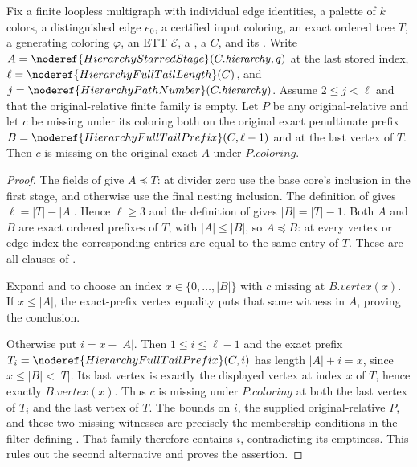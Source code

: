 \begin{helper}
Fix a finite loopless multigraph with individual edge identities,
a palette of $k$ colors, a distinguished edge $e_0$, a certified input
coloring, an exact ordered tree $T$, a generating coloring $\varphi$,
an ETT $\mathcal E$, a , a
 $C$, and its
.
Write $A=\noderef{HierarchyStarredStage}(C.\mathit{hierarchy},q)$ at
the last stored index, $\ell=\noderef{HierarchyFullTailLength}(C)$,
and $j=\noderef{HierarchyPathNumber}(C.\mathit{hierarchy})$.
Assume $2\le j<\ell$ and that the original-relative finite family
 is empty.
Let $P$ be any original-relative
 and let $c$ be missing
under its coloring both on the original exact penultimate prefix
$B=\noderef{HierarchyFullTailPrefix}(C,\ell-1)$ and at the last
vertex of $T$. Then $c$ is missing on the original exact $A$ under
$P.\mathit{coloring}$.
\end{helper}
\begin{proof}
The fields of  give
$A\preccurlyeq T$: at divider zero use the base core's inclusion
in the first stage, and otherwise use the final nesting inclusion.
The definition of  gives
$\ell=|T|-|A|$. Hence $\ell\ge3$ and the definition of
 gives $|B|=|T|-1$.
Both $A$ and $B$ are exact ordered prefixes of $T$, with
$|A|\le|B|$, so $A\preccurlyeq B$: at every vertex or edge index
the corresponding entries are equal to the same entry of $T$.
These are all clauses of .

Expand  and
 to choose an index
$x\in\{0,\ldots,|B|\}$ with $c$ missing at $B.\mathit{vertex}(x)$.
If $x\le|A|$, the exact-prefix vertex equality puts that same
witness in $A$, proving the conclusion.

Otherwise put $i=x-|A|$. Then $1\le i\le\ell-1$ and the exact
prefix $T_i=\noderef{HierarchyFullTailPrefix}(C,i)$ has length
$|A|+i=x$, since $x\le|B|<|T|$. Its last vertex is exactly the
displayed vertex at index $x$ of $T$, hence exactly
$B.\mathit{vertex}(x)$. Thus $c$ is missing under $P.\mathit{coloring}$
at both the last vertex of $T_i$ and the last vertex of $T$.
The bounds on $i$, the supplied original-relative $P$, and these
two missing witnesses are precisely the membership conditions in
the filter defining .
That family therefore contains $i$, contradicting its emptiness.
This rules out the second alternative and proves the assertion.
\end{proof}
